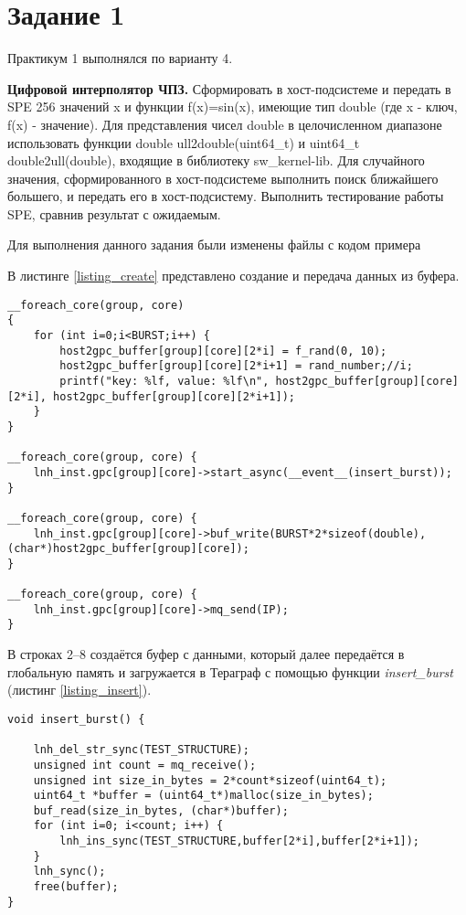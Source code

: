 \chapter*{Задание 1}

Практикум 1 выполнялся по варианту 4.

\textbf{Цифровой интерполятор ЧПЗ.} Сформировать в хост-подсистеме и передать в SPE 256 значений x и функции f(x)=sin(x), имеющие тип double (где x - ключ, f(x) - значение). Для представления чисел double в целочисленном диапазоне использовать функции double ull2double(uint64\_t) и uint64\_t double2ull(double), входящие в библиотеку sw\_kernel-lib. Для случайного значения, сформированного в хост-подсистеме выполнить поиск ближайшего большего, и передать его в хост-подсистему. Выполнить тестирование работы SPE, сравнив результат с ожидаемым.

Для выполнения данного задания были изменены файлы с кодом примера

В листинге \ref{listing_create} представлено создание и передача данных из буфера.

\begin{center}
	\begin{lstlisting}[label=listing_create,caption=Создание и передача данных из буфера]
	__foreach_core(group, core)
{
	for (int i=0;i<BURST;i++) {
		host2gpc_buffer[group][core][2*i] = f_rand(0, 10);
		host2gpc_buffer[group][core][2*i+1] = rand_number;//i;
		printf("key: %lf, value: %lf\n", host2gpc_buffer[group][core][2*i], host2gpc_buffer[group][core][2*i+1]);
	}
}

__foreach_core(group, core) {
	lnh_inst.gpc[group][core]->start_async(__event__(insert_burst));
}

__foreach_core(group, core) {
	lnh_inst.gpc[group][core]->buf_write(BURST*2*sizeof(double),(char*)host2gpc_buffer[group][core]);
}

__foreach_core(group, core) {
	lnh_inst.gpc[group][core]->mq_send(IP);
}
	\end{lstlisting}
\end{center}

В строках 2--8 создаётся буфер с данными, который далее передаётся в глобальную память и загружается в Тераграф с помощью функции \textit{insert\_burst} (листинг \ref{listing_insert}).

\begin{center}
	\begin{lstlisting}[label=listing_insert,caption=Создание и заполнение графа]
void insert_burst() {
	
	lnh_del_str_sync(TEST_STRUCTURE);
	unsigned int count = mq_receive();
	unsigned int size_in_bytes = 2*count*sizeof(uint64_t);
	uint64_t *buffer = (uint64_t*)malloc(size_in_bytes);
	buf_read(size_in_bytes, (char*)buffer);
	for (int i=0; i<count; i++) {
		lnh_ins_sync(TEST_STRUCTURE,buffer[2*i],buffer[2*i+1]);
	}
	lnh_sync();
	free(buffer);
}	\end{lstlisting}
\end{center}

